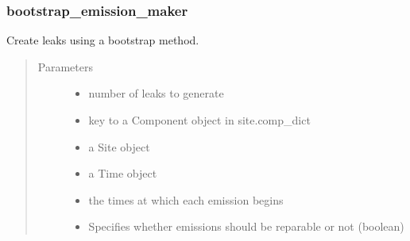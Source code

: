 \documentclass[letterpaper,10pt,english]{sphinxmanual}
\begin{document}
\subsubsection{bootstrap\_emission\_maker}
\label{\detokenize{index:bootstrap-emission-maker}}

\begin{fulllineitems}
\label{\detokenize{index:feast.EmissionSimModules.emission_class_functions.bootstrap_emission_maker}}
Create leaks using a bootstrap method.
\begin{quote}\begin{description}
\item[{Parameters}] \leavevmode\begin{itemize}
\item {} 
 \textendash{} number of leaks to generate

\item {} 
 \textendash{} key to a Component object in site.comp\_dict

\item {} 
 \textendash{} a Site object

\item {} 
 \textendash{} a Time object

\item {} 
 \textendash{} the times at which each emission begins

\item {} 
 \textendash{} Specifies whether emissions should be reparable or not (boolean)

\end{itemize}

\end{description}\end{quote}

\end{fulllineitems}
\end{document}

